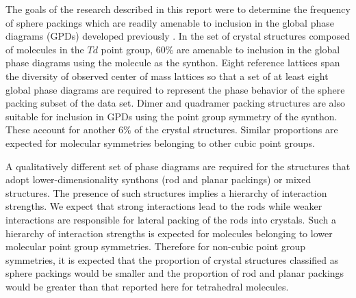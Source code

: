 \documentclass{iucr}              %
\begin{document}
The goals of the research described in this report were to determine the frequency of sphere packings which are readily amenable to inclusion in the global phase diagrams (GPDs) developed previously \cite{Keith04c,Mettes04}.  In the set of crystal structures composed of molecules in the $Td$ point group, 60\% are amenable to inclusion in the global phase diagrams using the molecule as the synthon.  Eight reference lattices span the diversity of observed center of mass lattices so that a set of at least eight global phase diagrams are required to represent the phase behavior of the sphere packing subset of the data set.  Dimer and quadramer packing structures are also suitable for inclusion in GPDs using the point group symmetry of the synthon.  These account for another 6\% of the crystal structures.  Similar proportions are expected for molecular symmetries belonging to other cubic point groups.  

A qualitatively different set of phase diagrams are required for the structures that adopt lower-dimensionality synthons (rod and planar packings) or mixed structures.  The presence of such structures implies a hierarchy of interaction strengths.  We expect that strong interactions lead to the rods while weaker interactions are responsible for lateral packing of the rods into crystals.  Such a hierarchy of interaction strengths is expected for molecules belonging to lower molecular point group symmetries.  Therefore for non-cubic point group symmetries, it is expected that the proportion of crystal structures classified as sphere packings would be smaller and the proportion of rod and planar packings would be greater than that reported here for tetrahedral molecules.

%




\appendix

\end{document}
